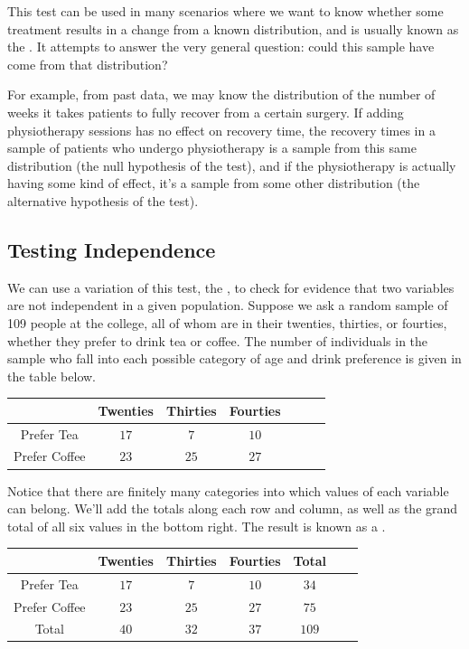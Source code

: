 This test can be used in many scenarios where we want to know whether some treatment results in a change from a known distribution, and is usually known as the . It attempts to answer the very general question: could this sample have come from that distribution?

For example, from past data, we may know the distribution of the number of weeks it takes patients to fully recover from a certain surgery. If adding physiotherapy sessions has no effect on recovery time, the recovery times in a sample of patients who undergo physiotherapy is a sample from this same distribution (the null hypothesis of the test), and if the physiotherapy is actually having some kind of effect, it's a sample from some other distribution (the alternative hypothesis of the test).

\subsection*{Testing Independence}

We can use a variation of this test, the , to check for evidence that two variables are not independent in a given population. Suppose we ask a random sample of 109 people at the college, all of whom are in their twenties, thirties, or fourties, whether they prefer to drink tea or coffee. The number of individuals in the sample who fall into each possible category of age and drink preference is given in the table below.
\renewcommand{\arraystretch}{1.25}
\begin{center}
\begin{tabular}{|c|c|c|c|c|c|c|}
\hline
 & Twenties & Thirties & Fourties \\
\hline
Prefer Tea & $17$ & $7$ & $10$  \\
\hline
Prefer Coffee & $23$ & $25$ & $27$ \\
\hline
\end{tabular}
\end{center}

Notice that there are finitely many categories into which values of each variable can belong. We'll add the totals along each row and column, as well as the grand total of all six values in the bottom right. The result is known as a .
\renewcommand{\arraystretch}{1.25}
\begin{center}
\begin{tabular}{|c|c|c|c|c|c|c|}
\hline
 & Twenties & Thirties & Fourties & Total \\
\hline
Prefer Tea & $17$ & $7$ & $10$ & $34$  \\
\hline
Prefer Coffee & $23$ & $25$ & $27$ & $75$ \\
\hline
Total & $40$ & $32$ & $37$  & $109$ \\
\hline
\end{tabular}
\end{center}

